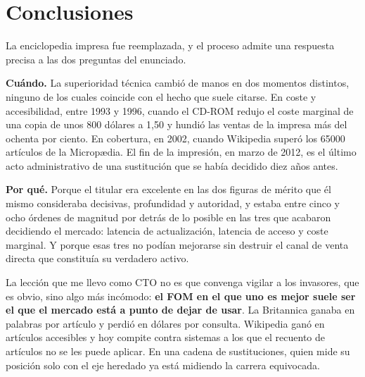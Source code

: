 \documentclass[11pt,letterpaper]{article}
\begin{document}
\section*{Conclusiones}

La enciclopedia impresa fue reemplazada, y el proceso admite una respuesta
precisa a las dos preguntas del enunciado.

\textbf{Cuándo.} La superioridad técnica cambió de manos en dos momentos
distintos, ninguno de los cuales coincide con el hecho que suele citarse. En
coste y accesibilidad, entre 1993 y 1996, cuando el CD-ROM redujo el coste
marginal de una copia de unos 800 dólares a 1,50 y hundió las ventas de la
impresa más del ochenta por ciento. En cobertura, en 2002, cuando Wikipedia
superó los \num{65000} artículos de la Micropædia. El fin de la impresión, en
marzo de 2012, es el último acto administrativo de una sustitución que se había
decidido diez años antes.

\textbf{Por qué.} Porque el titular era excelente en las dos figuras de mérito
que él mismo consideraba decisivas, profundidad y autoridad, y estaba entre cinco
y ocho órdenes de magnitud por detrás de lo posible en las tres que acabaron
decidiendo el mercado: latencia de actualización, latencia de acceso y coste
marginal. Y porque esas tres no podían mejorarse sin destruir el canal de venta
directa que constituía su verdadero activo.

La lección que me llevo como CTO no es que convenga vigilar a los invasores, que
es obvio, sino algo más incómodo: \textbf{el FOM en el que uno es mejor suele ser
el que el mercado está a punto de dejar de usar}. La Britannica ganaba en
palabras por artículo y perdió en dólares por consulta. Wikipedia ganó en
artículos accesibles y hoy compite contra sistemas a los que el recuento de
artículos no se les puede aplicar. En una cadena de sustituciones, quien mide su
posición solo con el eje heredado ya está midiendo la carrera equivocada.

\printbibliography[title={Referencias bibliográficas}]
\end{document}
